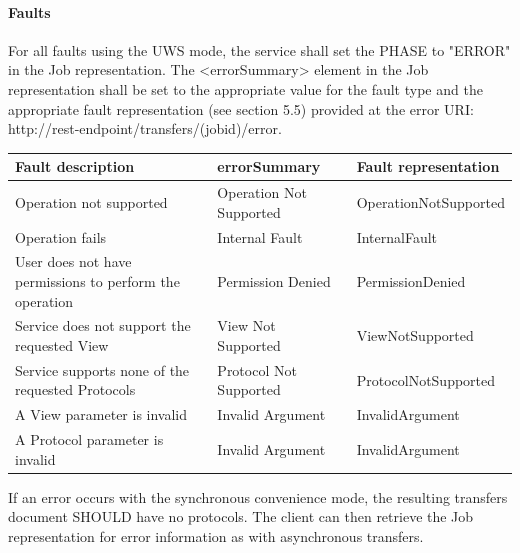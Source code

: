 \documentclass[11pt,a4paper]{ivoa}
\begin{document}
\paragraph{Faults}
For all faults using the UWS mode, the service shall set the PHASE to "ERROR" in the Job representation. The <errorSummary> element in the Job representation shall be set to the appropriate value for the fault type and the appropriate fault representation (see section 5.5) provided at the error URI: http://rest-endpoint/transfers/(jobid)/error.

\vspace{3mm}
\begin{tabular}{ p{5cm} l p{4cm} }
\textbf{Fault description} & \textbf{errorSummary} & \textbf{Fault representation} \\
\hline
Operation not supported & Operation Not Supported & OperationNotSupported \\
\hline
Operation fails & Internal Fault & InternalFault \\
\hline
User does not have permissions to perform the operation & Permission Denied & PermissionDenied \\
\hline
Service does not support the requested View & View Not Supported & ViewNotSupported \\
\hline
Service supports none of the requested Protocols & Protocol Not Supported &ProtocolNotSupported \\
\hline
A View parameter is invalid & Invalid Argument & InvalidArgument \\
\hline
A Protocol parameter is invalid & Invalid Argument & InvalidArgument \\
\hline
\end{tabular}
\vspace{3mm}

If an error occurs with the synchronous convenience mode, the resulting transfers document SHOULD have no protocols. The client can then retrieve the Job representation for error information as with asynchronous transfers.
\end{document}
